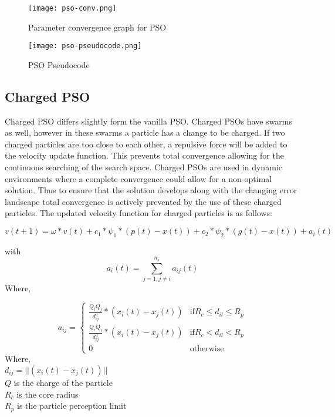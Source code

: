 \begin{figure}
  \centering
  \texttt{[image: pso-conv.png]}
  \caption{Parameter convergence graph for PSO}
  \label{fig:pso-convergence}
\end{figure}

 
\begin{figure}
  \centering
  \texttt{[image: pso-pseudocode.png]}
  \caption{PSO Pseudocode}
  \label{fig:pso-pseudocode}
\end{figure}


\subsection{Charged PSO}
	Charged PSO differs slightly form the vanilla PSO. Charged PSOs have swarms as well, however in these swarms a particle has a change to be charged. If two charged particles are too close to each other, a repulsive force will be added to the velocity update function. This prevents total convergence allowing for the continuous searching of the search space. Charged PSOs are used in dynamic environments where a complete convergence could allow for a non-optimal solution. Thus to ensure that the solution develops along with the changing error landscape total convergence is actively prevented by the use of these charged particles. The updated velocity function for charged particles is as follows:
	
	
\[ v(t+1) = \omega * v(t) + c_1*\psi_1 * (p(t) - x(t)) + c_2*\psi_2 * (g(t) - x(t)) + a_i(t)\]

with  \[ a_i(t) = \sum_{j=1, j\neq i}^{n_s} a_{ij}(t) \] Where,

\[a_{ij} = 
\begin{cases}  
\frac{Q_{i}Q_{j}}{d_{ij}^3} * (x_{i}(t)-x_{j}(t)) & \text{if} R_{c} \leq d_{il} \leq R_{p}\\ 
\frac{ Q_{i}Q_{j} }{d_{ij}^3}*(x_{i}(t)-x_{j}(t)) & \text{if} R_{c} < d_{il} < R_{p}\\ 
0 & \text{otherwise}
\end{cases}\] Where,\\
\indent $d_{ij} = ||(x_{i}(t)-x_{j}(t))||$\\
\indent $Q$ is the charge of the particle \\
\indent $R_{c}$ is the core radius \\
\indent $R_{p}$ is the particle perception limit
